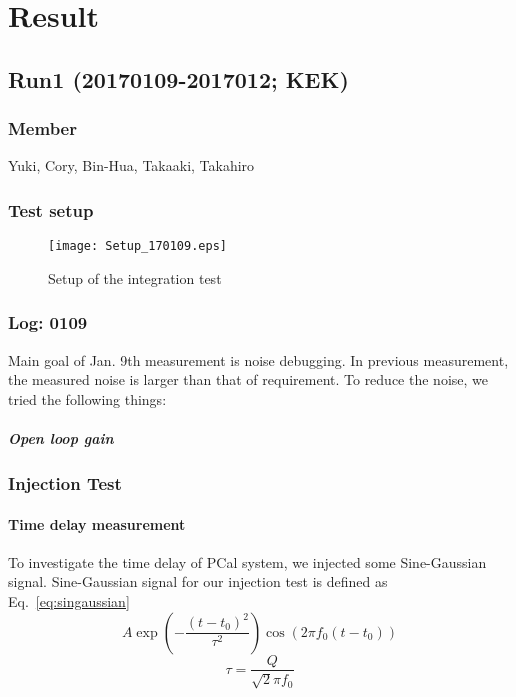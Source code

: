 
\chapter{Result} %

\label{Chapter2} %


\section{Run1 (20170109-2017012; KEK)}
\subsection{Member}
Yuki, Cory, Bin-Hua, Takaaki, Takahiro
\subsection{Test setup}
\begin{figure}
	\begin{center}
                 \texttt{[image: Setup\_170109.eps]}
                 \caption{Setup of the integration test} 
                 \label{fig:Setup} 
	\end{center}
\end{figure}
\subsection{Log: 01\/09}
Main goal of Jan. 9th measurement is noise debugging.
In previous measurement, the measured noise is larger than that of requirement.
To reduce the noise, we tried the following things:
\paragraph{Open loop gain}


\subsection{Injection Test}
\subsubsection{Time delay measurement}

To investigate the time delay of PCal system, we injected some Sine-Gaussian signal.
 Sine-Gaussian signal for our injection test is defined as Eq.~\ref{eq:singaussian}
\begin{equation}
\label{eq:singaussian}
    A \exp\left(-\frac{(t-t_0)^2}{\tau^2}\right) \cos ( 2 \pi f_0 (t-t_0))
\end{equation}
\begin{equation*}
   \tau = \frac{Q}{ \sqrt{2} \pi f_0}
\end{equation*}



